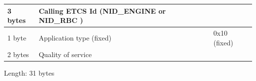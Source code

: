 \documentclass[nocc]{template/openetcs_report}
\begin{document}
\begin{longtable}{|l|l|l|}
				\hline
					\begin{minipage}[t]{0.1\linewidth}3 bytes \end{minipage}
					&\begin{minipage}[t]{0.6\linewidth} Calling ETCS Id (NID\_ENGINE or NID\_RBC )	\end{minipage}
					&\begin{minipage}[t]{0.3\linewidth} \end{minipage} \\
				
				\hline
					\begin{minipage}[t]{0.1\linewidth}1 byte \end{minipage}
					&\begin{minipage}[t]{0.6\linewidth} Application type (fixed)	\end{minipage}
					&\begin{minipage}[t]{0.3\linewidth}0x10 (fixed) \end{minipage} \\
				
				\hline
					\begin{minipage}[t]{0.1\linewidth}2 bytes \end{minipage}
					&\begin{minipage}[t]{0.6\linewidth} Quality of service	\end{minipage}
					&\begin{minipage}[t]{0.3\linewidth} \end{minipage} \\
				
				\hline
			\end{longtable}
			Length: 31 bytes
\end{document}
